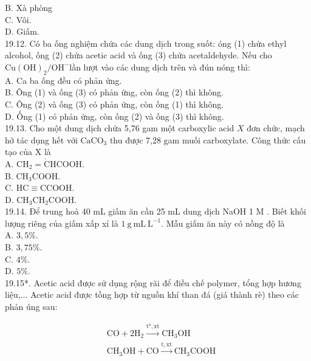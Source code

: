\documentclass[10pt]{article}
\begin{document}
B. Xà phòng\\
C. Vôi.\\
D. Giấm.\\
19.12. Có ba ống nghiệm chứa các dung dịch trong suốt: óng (1) chứa ethyl alcohol, ống (2) chứa acetic acid và ống (3) chứa acetaldehyde. Nếu cho $\mathrm{Cu}(\mathrm{OH})_{2} / \mathrm{OH}^{-}$lần lượt vào các dung dịch trên và đún nóng thì:\\
A. Ca ba ống đều có phản ứng.\\
B. Ông (1) và ống (3) có phản ứng, còn ống (2) thì không.\\
C. Ông (2) và ống (3) có phản ứng, còn ống (1) thì không.\\
D. Ống (1) có phản ứng, còn ống (2) và ống (3) thì không.\\
19.13. Cho một dung dịch chứa 5,76 gam một carboxylic acid $X$ đơn chức, mạch hở tác dụng hết với $\mathrm{CaCO}_{3}$ thu được 7,28 gam muối carboxylate. Công thức cấu tạo của X là\\
A. $\mathrm{CH}_{2}=\dot{\mathrm{C}} \mathrm{HCOOH}$.\\
B. $\mathrm{CH}_{3} \mathrm{COOH}$.\\
C. $\mathrm{HC} \equiv \mathrm{CCOOH}$.\\
D. $\mathrm{CH}_{3} \mathrm{CH}_{2} \mathrm{COOH}$.\\
19.14. Để trung hoà 40 mL giấm ăn cần 25 mL dung dịch NaOH 1 M . Biết khối lượng riêng của giấm xấp xỉ là $1 \mathrm{~g} \mathrm{~mL} \mathrm{~L}^{-1}$. Mẫu giấm ăn này có nồng độ là\\
A. $3,5 \%$.\\
B. $3,75 \%$.\\
C. $4 \%$.\\
D. $5 \%$.\\
19.15*. Acetic acid được sử dụng rộng rãi để điều chế polymer, tổng hợp hương liệu,... Acetic acid được tồng hợp từ nguồn khí than đá (giá thành rè) theo các phản úng sau:


\begin{align*}
& \mathrm{CO}+2 \mathrm{H}_{2} \xrightarrow{\mathrm{t}^{\mathrm{a}}, \mathrm{xt}} \mathrm{CH}_{3} \mathrm{OH}  \tag{1}\\
& \mathrm{CH}_{3} \mathrm{OH}+\mathrm{CO} \xrightarrow{\mathrm{t}, \mathrm{xt}} \mathrm{CH}_{3} \mathrm{COOH} \tag{2}
\end{align*}
\end{document}
